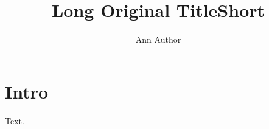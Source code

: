 \documentclass{article}
\title{Long Original Title}
\title{Short}
\author{Ann Author}
\makeatletter
\let\oldtitle\@title
\makeatother
\begin{document}
\begin{center}\oldtitle\end{center}
\maketitle
\section{Intro}
Text.
\end{document}
